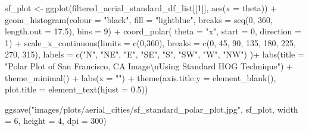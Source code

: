 \documentclass[
  letterpaper,
  DIV=11,
  numbers=noendperiod]{scrreprt}
\newenvironment{Shaded}{\begin{snugshade}}{\end{snugshade}}
\newcommand{\AttributeTok}[1]{\textcolor[rgb]{0.40,0.45,0.13}{#1}}
\newcommand{\DecValTok}[1]{\textcolor[rgb]{0.68,0.00,0.00}{#1}}
\newcommand{\FloatTok}[1]{\textcolor[rgb]{0.68,0.00,0.00}{#1}}
\newcommand{\FunctionTok}[1]{\textcolor[rgb]{0.28,0.35,0.67}{#1}}
\newcommand{\NormalTok}[1]{\textcolor[rgb]{0.00,0.23,0.31}{#1}}
\newcommand{\OtherTok}[1]{\textcolor[rgb]{0.00,0.23,0.31}{#1}}
\newcommand{\SpecialCharTok}[1]{\textcolor[rgb]{0.37,0.37,0.37}{#1}}
\newcommand{\StringTok}[1]{\textcolor[rgb]{0.13,0.47,0.30}{#1}}
\begin{document}
\begin{Shaded}
\begin{Highlighting}[]
\NormalTok{sf\_plot }\OtherTok{\textless{}{-}}
  \FunctionTok{ggplot}\NormalTok{(filtered\_aerial\_standard\_df\_list[[}\DecValTok{1}\NormalTok{]], }
         \FunctionTok{aes}\NormalTok{(}\AttributeTok{x =}\NormalTok{ theta)) }\SpecialCharTok{+}
  \FunctionTok{geom\_histogram}\NormalTok{(}\AttributeTok{colour =} \StringTok{"black"}\NormalTok{, }
                 \AttributeTok{fill =} \StringTok{"lightblue"}\NormalTok{, }
                 \AttributeTok{breaks =} \FunctionTok{seq}\NormalTok{(}\DecValTok{0}\NormalTok{, }\DecValTok{360}\NormalTok{, }\AttributeTok{length.out =} \FloatTok{17.5}\NormalTok{),}
                 \AttributeTok{bins =} \DecValTok{9}\NormalTok{) }\SpecialCharTok{+}
  \FunctionTok{coord\_polar}\NormalTok{(}
    \AttributeTok{theta =} \StringTok{"x"}\NormalTok{, }
    \AttributeTok{start =} \DecValTok{0}\NormalTok{, }
    \AttributeTok{direction =} \DecValTok{1}\NormalTok{) }\SpecialCharTok{+}
  \FunctionTok{scale\_x\_continuous}\NormalTok{(}\AttributeTok{limits =} \FunctionTok{c}\NormalTok{(}\DecValTok{0}\NormalTok{,}\DecValTok{360}\NormalTok{),}
    \AttributeTok{breaks =} \FunctionTok{c}\NormalTok{(}\DecValTok{0}\NormalTok{, }\DecValTok{45}\NormalTok{, }\DecValTok{90}\NormalTok{, }\DecValTok{135}\NormalTok{, }\DecValTok{180}\NormalTok{, }\DecValTok{225}\NormalTok{, }\DecValTok{270}\NormalTok{, }\DecValTok{315}\NormalTok{), }
    \AttributeTok{labels =} \FunctionTok{c}\NormalTok{(}\StringTok{"N"}\NormalTok{, }\StringTok{"NE"}\NormalTok{, }\StringTok{"E"}\NormalTok{, }\StringTok{"SE"}\NormalTok{, }\StringTok{"S"}\NormalTok{, }\StringTok{"SW"}\NormalTok{, }\StringTok{"W"}\NormalTok{, }\StringTok{"NW"}\NormalTok{)}
\NormalTok{  )}\SpecialCharTok{+}
  \FunctionTok{labs}\NormalTok{(}\AttributeTok{title =} \StringTok{"Polar Plot of San Francisco, CA Image}\SpecialCharTok{\textbackslash{}n}\StringTok{Using Standard HOG Technique"}\NormalTok{) }\SpecialCharTok{+}
  \FunctionTok{theme\_minimal}\NormalTok{() }\SpecialCharTok{+}
  \FunctionTok{labs}\NormalTok{(}\AttributeTok{x =} \StringTok{""}\NormalTok{) }\SpecialCharTok{+}
  \FunctionTok{theme}\NormalTok{(}\AttributeTok{axis.title.y =} \FunctionTok{element\_blank}\NormalTok{(),}
        \AttributeTok{plot.title =} \FunctionTok{element\_text}\NormalTok{(}\AttributeTok{hjust =} \FloatTok{0.5}\NormalTok{))}

\FunctionTok{ggsave}\NormalTok{(}\StringTok{"images/plots/aerial\_cities/sf\_standard\_polar\_plot.jpg"}\NormalTok{, sf\_plot, }\AttributeTok{width =} \DecValTok{6}\NormalTok{, }\AttributeTok{height =} \DecValTok{4}\NormalTok{, }\AttributeTok{dpi =} \DecValTok{300}\NormalTok{)}
\end{Highlighting}
\end{Shaded}
\end{document}

